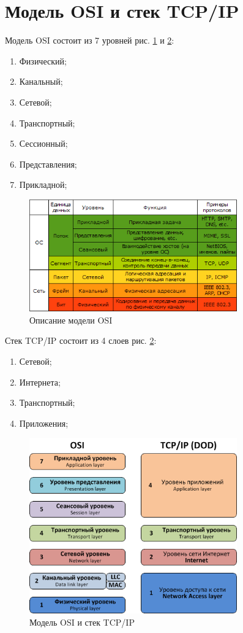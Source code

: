 \section{Модель OSI и стек TCP/IP}

Модель OSI состоит из 7 уровней рис. \ref{fig1} и \ref{fig2}:
\begin{enumerate}
\item Физический;
\item Канальный;
\item Сетевой;
\item Транспортный;
\item Сессионный;
\item Представления;
\item Прикладной;
\end{enumerate}

\begin{figure}[h!]
\centering
\includegraphics[width=0.8\textwidth]{exampleosi}
\caption{Описание модели OSI}
\label{fig1}
\end{figure}

Стек TCP/IP состоит из 4 слоев рис. \ref{fig2}:
\begin{enumerate}
\item Сетевой;
\item Интернета;
\item Транспортный;
\item Приложения;
\end{enumerate}

\begin{figure}[h!]
\centering
\includegraphics[width=0.8\textwidth]{ositcp}
\caption{Модель OSI и стек TCP/IP}
\label{fig2}
\end{figure}

